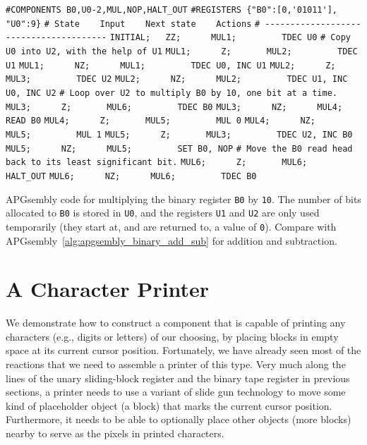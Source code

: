 \begin{apgsembly}
	\begin{algorithmic}\small
		\State \verb|#COMPONENTS B0,U0-2,MUL,NOP,HALT_OUT|
		\State \verb|#REGISTERS {"B0":[0,'01011'], "U0":9}|
		\State \verb|# State    Input    Next state    Actions|
		\State \verb|# ---------------------------------------|
		\State \verb|INITIAL;   ZZ;      MUL1;         TDEC U0|
		\State \verb||
		\State \verb|# Copy U0 into U2, with the help of U1|
		\State \verb|MUL1;      Z;       MUL2;         TDEC U1|
		\State \verb|MUL1;      NZ;      MUL1;         TDEC U0, INC U1|
		\State \verb|MUL2;      Z;       MUL3;         TDEC U2|
		\State \verb|MUL2;      NZ;      MUL2;         TDEC U1, INC U0, INC U2|
		\State \verb||
		\State \verb|# Loop over U2 to multiply B0 by 10, one bit at a time.|
		\State \verb|MUL3;      Z;       MUL6;         TDEC B0|
		\State \verb|MUL3;      NZ;      MUL4;         READ B0|
		\State \verb|MUL4;      Z;       MUL5;         MUL 0|
		\State \verb|MUL4;      NZ;      MUL5;         MUL 1|
		\State \verb|MUL5;      Z;       MUL3;         TDEC U2, INC B0|
		\State \verb|MUL5;      NZ;      MUL5;         SET B0, NOP|
		\State \verb||
		\State \verb|# Move the B0 read head back to its least significant bit.|
		\State \verb|MUL6;      Z;       MUL6;         HALT_OUT|
		\State \verb|MUL6;      NZ;      MUL6;         TDEC B0|
	\end{algorithmic}
	\caption{APGsembly code for multiplying the binary register \texttt{B0} by \texttt{10}. The number of bits allocated to \texttt{B0} is stored in \texttt{U0}, and the registers \texttt{U1} and \texttt{U2} are only used temporarily (they start at, and are returned to, a value of \texttt{0}). Compare with APGsembly~\ref{alg:apgsembly_binary_add_sub} for addition and subtraction.}\label{alg:apgsembly_mul_ten}
\end{apgsembly}


\section{A Character Printer}\label{sec:decimal_printer}

We demonstrate how to construct a component that is capable of printing any characters (e.g., digits or letters) of our choosing, by placing blocks in empty space at its current cursor position. Fortunately, we have already seen most of the reactions that we need to assemble a printer of this type. Very much along the lines of the unary sliding-block register and the binary tape register in previous sections, a printer needs to use a variant of slide gun technology to move some kind of placeholder object (a block) that marks the current cursor position. Furthermore, it needs to be able to optionally place other objects (more blocks) nearby to serve as the pixels in printed characters.

